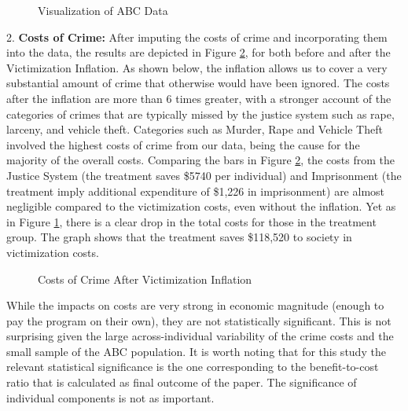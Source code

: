 \documentclass[11pt]{amsart}
\begin{document}
\begin{figure} [H]
\caption{Visualization of ABC Data} 
\centering \label{tab:lifehistory}
{} 
\end{figure} 

2. \textbf{Costs of Crime:} After imputing the costs of crime and incorporating them into the data, the results are depicted in Figure \ref{tab:cost-graph}, for both before and after the Victimization Inflation. As shown below, the inflation allows us to cover a very substantial amount of crime that otherwise would have been ignored. The costs after the inflation are more than 6 times greater, with a stronger account of the categories of crimes that are typically missed by the justice system such as rape, larceny, and vehicle theft. Categories such as Murder, Rape and Vehicle Theft involved the highest costs of crime from our data, being the cause for the majority of the overall costs. Comparing the bars in Figure \ref{tab:cost-graph}, the costs from the Justice System (the treatment saves \$5740 per individual) and Imprisonment (the treatment imply additional expenditure of \$1,226 in imprisonment) are almost negligible compared to the victimization costs, even without the inflation. Yet as in Figure \ref{tab:lifehistory}, there is a clear drop in the total costs for those in the treatment group. The graph shows that the treatment saves \$118,520 to society in victimization costs.

\begin{figure} [H]
\caption{Costs of Crime After Victimization Inflation} 
\centering  \label{tab:cost-graph}
{} 
\end{figure}

While the impacts on costs are very strong in economic magnitude (enough to pay the program on their own), they are not statistically significant. This is not surprising given the large across-individual variability of the crime costs and the  small sample of the ABC population. It is worth noting that for this study the relevant statistical significance is the one corresponding to the benefit-to-cost ratio that is calculated as final outcome of the paper. The significance of individual components is not as important.

\clearpage


\end{document}
